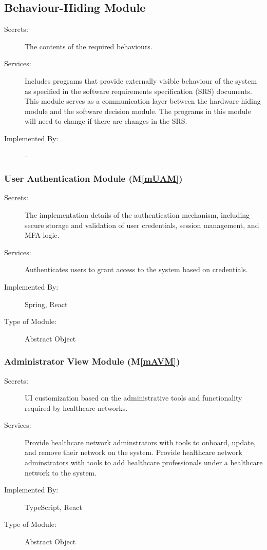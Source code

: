 \documentclass[12pt, titlepage]{article}
\newcommand{\mref}[1]{M\ref{#1}}
\begin{document}
\subsection{Behaviour-Hiding Module}

\begin{description}
\item[Secrets:]The contents of the required behaviours.
\item[Services:]Includes programs that provide externally visible behaviour of the system as specified in the software requirements specification (SRS) documents. This module serves as a communication layer between the hardware-hiding module and the software decision module. The programs in this module will need to change if there are changes in the SRS.
\item[Implemented By:] --
\end{description}

\subsubsection{User Authentication Module (\mref{mUAM})} 

\begin{description}
\item[Secrets:]The implementation details of the authentication mechanism, including secure storage and validation of user credentials, session management, and MFA logic.
\item[Services:]Authenticates users to grant access to the system based on credentials.
\item[Implemented By:]Spring, React
\item[Type of Module:]Abstract Object
\end{description}

\subsubsection{Administrator View Module (\mref{mAVM})}

\begin{description}
\item[Secrets:]UI customization based on the administrative tools and functionality required by healthcare networks.
\item[Services:]Provide healthcare network adminstrators with tools to onboard, update, and remove their network on the system. Provide healthcare network adminstrators with tools to add healthcare professionals under a healthcare network to the system.
\item[Implemented By:]TypeScript, React
\item[Type of Module:]Abstract Object
\end{description}
\end{document}
